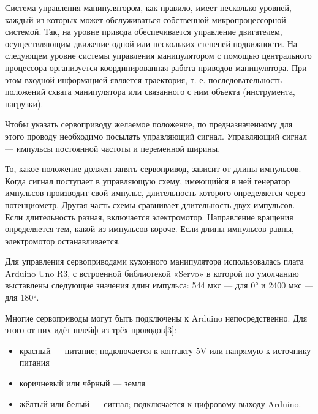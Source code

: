 Система управления манипулятором, как правило, имеет несколько уровней, каждый из которых может обслуживаться собственной микропроцессорной системой. Так, на уровне привода обеспечивается управление двигателем, осуществляющим движение одной или нескольких степеней подвижности. На следующем уровне системы управления манипулятором с помощью центрального процессора организуется координированная работа приводов манипулятора. При этом входной информацией является траектория, т. е. последовательность положений схвата манипулятора или связанного с ним объекта (инструмента, нагрузки).

Чтобы указать сервоприводу желаемое положение, по предназначенному для этого проводу необходимо посылать управляющий сигнал. Управляющий сигнал — импульсы постоянной частоты и переменной ширины.

То, какое положение должен занять сервопривод, зависит от длины импульсов. Когда сигнал поступает в управляющую схему, имеющийся в ней генератор импульсов производит свой импульс, длительность которого определяется через потенциометр. Другая часть схемы сравнивает длительность двух импульсов. Если длительность разная, включается электромотор. Направление вращения определяется тем, какой из импульсов короче. Если длины импульсов равны, электромотор останавливается. 

Для управления сервоприводами кухонного манипулятора использовалась плата Arduino Uno R3, с встроенной библиотекой «Servo» в которой по умолчанию выставлены следующие значения длин импульса: 544 мкс — для 0° и 2400 мкс — для 180°. 

Многие сервоприводы могут быть подключены к Arduino непосредственно. Для этого от них идёт шлейф из трёх проводов[3]:
\begin{itemize}
  \item красный — питание; подключается к контакту 5V или напрямую к источнику питания 
  \item коричневый или чёрный — земля
  \item жёлтый или белый — сигнал; подключается к цифровому выходу Arduino.
\end{itemize}

